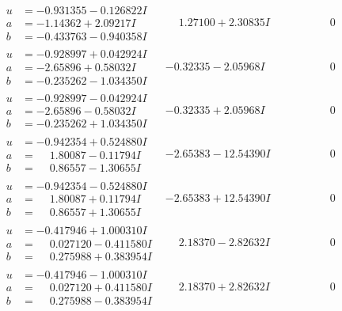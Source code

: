 \documentclass[1p]{elsarticle_modified}
\theoremstyle{definition}
\begin{document}
$$\begin{array}{c|c|c}
\begin{aligned}
u &= -0.931355 - 0.126822 I \\
a &= -1.14362 + 2.09217 I \\
b &= -0.433763 - 0.940358 I\end{aligned}
 & \phantom{-}1.27100 + 2.30835 I & \phantom{-0.000000 } 0 \\ \hline\begin{aligned}
u &= -0.928997 + 0.042924 I \\
a &= -2.65896 + 0.58032 I \\
b &= -0.235262 - 1.034350 I\end{aligned}
 & -0.32335 - 2.05968 I & \phantom{-0.000000 } 0 \\ \hline\begin{aligned}
u &= -0.928997 - 0.042924 I \\
a &= -2.65896 - 0.58032 I \\
b &= -0.235262 + 1.034350 I\end{aligned}
 & -0.32335 + 2.05968 I & \phantom{-0.000000 } 0 \\ \hline\begin{aligned}
u &= -0.942354 + 0.524880 I \\
a &= \phantom{-}1.80087 - 0.11794 I \\
b &= \phantom{-}0.86557 - 1.30655 I\end{aligned}
 & -2.65383 - 12.54390 I & \phantom{-0.000000 } 0 \\ \hline\begin{aligned}
u &= -0.942354 - 0.524880 I \\
a &= \phantom{-}1.80087 + 0.11794 I \\
b &= \phantom{-}0.86557 + 1.30655 I\end{aligned}
 & -2.65383 + 12.54390 I & \phantom{-0.000000 } 0 \\ \hline\begin{aligned}
u &= -0.417946 + 1.000310 I \\
a &= \phantom{-}0.027120 - 0.411580 I \\
b &= \phantom{-}0.275988 + 0.383954 I\end{aligned}
 & \phantom{-}2.18370 - 2.82632 I & \phantom{-0.000000 } 0 \\ \hline\begin{aligned}
u &= -0.417946 - 1.000310 I \\
a &= \phantom{-}0.027120 + 0.411580 I \\
b &= \phantom{-}0.275988 - 0.383954 I\end{aligned}
 & \phantom{-}2.18370 + 2.82632 I & \phantom{-0.000000 } 0 \\ \hline\begin{aligned}

\end{aligned}
\end{array}$$
\end{document}
